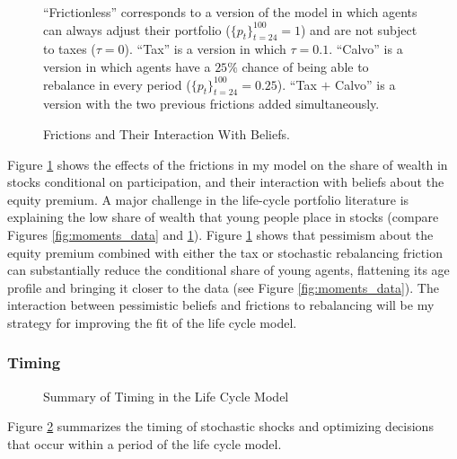 \documentclass[./RiskyContrib.tex]{subfiles}
\begin{document}
\begin{figure}
\begin{center}
\end{center}
\scriptsize ``Frictionless'' corresponds to a version of the model in which
agents can always adjust their portfolio ($\{p_t\}_{t=24}^{100} = 1$) and are
not subject to taxes ($\tau = 0$). ``Tax'' is a version in which $\tau = 0.1$.
``Calvo'' is a version in which agents have a $25\%$ chance of being able to
rebalance in every period ($\{p_t\}_{t=24}^{100} = 0.25$). ``Tax $+$ Calvo''
is a version with the two previous frictions added simultaneously.

\caption{Frictions and Their Interaction With Beliefs.}\label{fig:frict_beliefs}
\end{figure}

Figure \ref{fig:frict_beliefs} shows the effects of the frictions in my model
on the share of wealth in stocks conditional on participation, and their
interaction with beliefs about the equity premium. A major challenge in the
life-cycle portfolio literature is explaining the low share of wealth that
young people place in stocks (compare Figures \ref{fig:moments_data} and
\ref{fig:frict_beliefs}). Figure \ref{fig:frict_beliefs} shows that pessimism
about the equity premium combined with either the tax or stochastic rebalancing
friction can substantially reduce the conditional share of young agents, flattening
its age profile and bringing it closer to the data
(see Figure \ref{fig:moments_data}). The interaction between pessimistic beliefs
and frictions to rebalancing will be my strategy for improving the fit of the
life cycle model.

\subsubsection{Timing}

\begin{figure}

\begin{center}
%
\caption{Summary of Timing in the Life Cycle Model}\label{fig:timing_diagram}
\end{center}
\end{figure}

Figure \ref{fig:timing_diagram} summarizes the timing of stochastic shocks and
optimizing decisions that occur within a period of the life cycle model.
\end{document}
